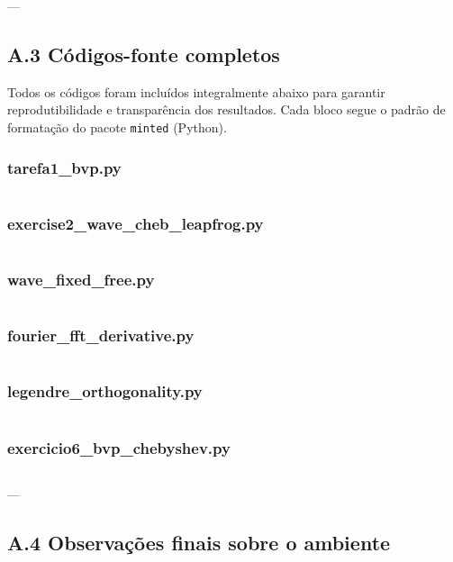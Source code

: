 \documentclass[12pt,a4paper]{article}
\begin{document}
---

\subsection{A.3 Códigos-fonte completos}

Todos os códigos foram incluídos integralmente abaixo para garantir reprodutibilidade e transparência dos resultados.  
Cada bloco segue o padrão de formatação do pacote \texttt{minted} (Python).

\subsubsection{tarefa1\_bvp.py}
\inputminted[fontsize=\small,breaklines,frame=lines]{python}{code/tarefa1_bvp.py}

\subsubsection{exercise2\_wave\_cheb\_leapfrog.py}
\inputminted[fontsize=\small,breaklines,frame=lines]{python}{code/exercise2_wave_cheb_leapfrog.py}

\subsubsection{wave\_fixed\_free.py}
\inputminted[fontsize=\small,breaklines,frame=lines]{python}{code/wave_fixed_free.py}

\subsubsection{fourier\_fft\_derivative.py}
\inputminted[fontsize=\small,breaklines,frame=lines]{python}{code/fourier_fft_derivative.py}

\subsubsection{legendre\_orthogonality.py}
\inputminted[fontsize=\small,breaklines,frame=lines]{python}{code/legendre_orthogonality.py}

\subsubsection{exercicio6\_bvp\_chebyshev.py}
\inputminted[fontsize=\small,breaklines,frame=lines]{python}{code/exercicio6_bvp_chebyshev.py}

---

\subsection{A.4 Observações finais sobre o ambiente}
\end{document}
